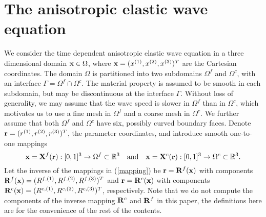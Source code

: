 \section{The anisotropic elastic wave equation}
We consider the time dependent anisotropic elastic wave equation in a three dimensional domain ${\bf x}\in\Omega$, where ${\bf x} = (x^{(1)},x^{(2)},x^{(3)})^T$ are the Cartesian coordinates. The domain $\Omega$ is partitioned into two subdomains $\Omega^f$ and $\Omega^c$, with an interface $\Gamma = \Omega^f\cap\Omega^c$. The material property is assumed to be smooth in each subdomain, but may be discontinuous at the interface $\Gamma$. Without loss of generality, we may assume that the wave speed is slower in $\Omega^f$ than in $\Omega^c$, which motivates us to use a fine mesh in $\Omega^f$ and a coarse mesh in $\Omega^c$. We further assume that both $\Omega^f$ and $\Omega^c$ have six, possibly curved boundary faces. Denote ${\bf r} = (r^{(1)},r^{(2)},r^{(3)})^T$, the parameter coordinates, and  introduce smooth one-to-one mappings 
\begin{equation}\label{mapping}
{\bf x}= {\bf X}^{f}({\bf r}) :  [0,1]^3 \rightarrow \Omega^{f} \subset \mathbb{R}^3 \ \ \ \mbox{and} \ \ \ {\bf x} = {\bf X}^{c}({\bf r}) :  [0,1]^3 \rightarrow \Omega^{c} \subset \mathbb{R}^3.
\end{equation}
Let the inverse of the mappings in (\ref{mapping}) be ${\bf r} = {\bf R}^f({\bf x})$ with components ${\bf R}^f({\bf x}) = (R^{f,(1)}, R^{f,(2)}, R^{f,(3)})^T$ and ${\bf r} = {\bf R}^c({\bf x})$ with components ${\bf R}^c({\bf x}) = (R^{c,(1)}, R^{c,(2)}, R^{c,(3)})^T$, respectively. Note that we do not compute the components of the inverse mapping ${\bf R}^c$ and ${\bf R}^f$ in this paper, the definitions here are for the convenience of the rest of the contents.
 
